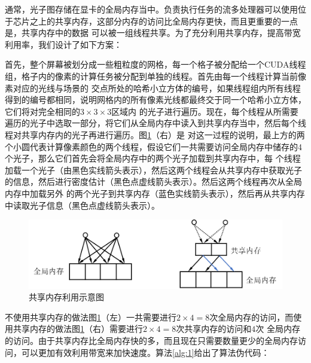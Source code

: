 \documentclass[UTF8]{ctexart}
\begin{document}
        通常，光子图存储在显卡的全局内存当中。负责执行任务的流多处理器可以使用位于芯片之上的共享内存，这部分内存的访问比全局内存更快，而且更重要的一点是，共享内存中的数据
        可以被一组线程共享。为了充分利用共享内存，提高带宽利用率，我们设计了如下方案：
        
        首先，整个屏幕被划分成一些粗粒度的网格，每一个格子被分配给一个CUDA线程组，格子内的像素的计算任务被分配到单独的线程。首先由每一个线程计算当前像素对应的光线与场景的
        交点所处的哈希小立方体的编号，如果线程组内所有线程得到的编号都相同，说明网格内的所有像素光线都最终交于同一个哈希小立方体，它们将对完全相同的$3\times3\times3$区域内
        的光子进行遍历。现在，每个线程从所需要遍历的光子中选取一部分，将它们从全局内存中读入到共享内存当中，然后每个线程对共享内存内的光子再进行遍历。图\ref{fig:5}（右）是
        对这一过程的说明，最上方的两个小圆代表计算像素颜色的两个线程，假设它们一共需要访问全局内存中储存的4个光子，那么它们首先会将全局内存中的两个光子加载到共享内存中，每
        个线程加载一个光子（由黑色实线箭头表示），然后这两个线程会从共享内存中获取光子的信息，然后进行密度估计（黑色点虚线箭头表示）。然后这两个线程再次从全局内存中加载另外
        的两个光子到共享内存（蓝色实线箭头表示），然后再从共享内存中读取光子信息（黑色点虚线箭头表示）。
        
        \begin{figure}[htbp]
        \centering
        \includegraphics[scale=0.7]{pic/SharedMemory.png}
        \caption{共享内存利用示意图}
        \label{fig:5}
        \end{figure}
        
        不使用共享内存的做法图\ref{fig:5}（左）一共需要进行$2\times4=8$次全局内存的访问，而使用共享内存的做法图\ref{fig:5}（右）需要进行$2\times4=8$次共享内存的访问和$4$次
        全局内存的访问。由于共享内存比全局内存快的多，而且现在只需要数量更少的全局内存访问，可以更加有效利用带宽来加快速度。算法\ref{alg:1}给出了算法伪代码：
        
        \renewcommand{\algorithmicrequire}{\textbf{Input:}} 
        \renewcommand{\algorithmicensure}{\textbf{Output:}}
        
\end{document}
